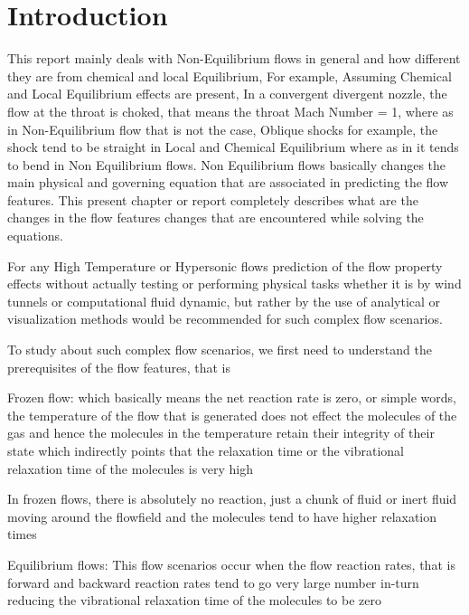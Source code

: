 \section{Introduction}
\label{sec:intro}

This report mainly deals with Non-Equilibrium flows in general and how different they are from chemical and local Equilibrium, For example, Assuming Chemical and Local Equilibrium effects are present, In a convergent divergent nozzle, the flow at the throat is choked, that means the throat Mach Number = 1, where as in Non-Equilibrium flow that is not the case, Oblique shocks for example, the shock tend to be straight in Local and Chemical Equilibrium where as in it tends to bend in Non Equilibrium flows. Non Equilibrium flows basically changes the main physical and governing equation that are associated in predicting the flow features. This present chapter or report completely describes what are the changes in the flow features changes that are encountered while solving the equations.

\hspace{1cm}


For any  High Temperature or Hypersonic flows prediction of the flow property effects without actually testing or performing physical tasks whether it is by wind tunnels or computational fluid dynamic, but rather by the use of analytical or visualization methods would be recommended for such complex flow scenarios.

\hspace{1cm}
 
To study about such complex flow scenarios, we first need to understand the prerequisites of the flow features, that is

\vspace{1cm}
Frozen flow: which basically means the net reaction rate is zero, or simple words, the temperature of the flow that is generated does not effect the molecules of the gas and hence the molecules in the temperature retain their integrity of their state which indirectly points that the relaxation time or the vibrational relaxation time of the molecules is very high 


\vspace{1cm}
In frozen flows, there is absolutely no reaction, just a chunk of fluid or inert fluid moving around the flowfield and the molecules tend to have higher relaxation times
\vspace{1cm}


Equilibrium flows: This flow scenarios occur when the flow reaction rates, that is forward and backward reaction rates tend to go very large number in-turn reducing the vibrational relaxation time of the molecules to be zero

